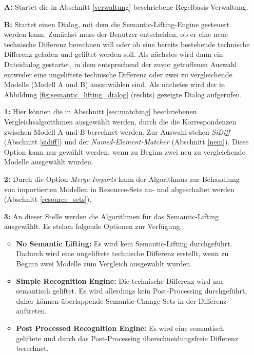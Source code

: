 \begin{itemize}
  \item[\textbf{A:}] Startet die in Abschnitt \ref{verwaltung} beschriebene Regelbasis-Verwaltung.
 
  \item[\textbf{B:}] Startet einen Dialog, mit dem die Semantic-Lifting-Engine gesteuert werden
  kann. Zunächst muss der Benutzer entscheiden, ob er eine neue technische Differenz berechnen will
  oder ob eine bereits bestehende technische Differenz geladen und geliftet werden soll. Als nächstes wird dann
  ein Dateidialog gestartet, in dem entsprechend der zuvor getroffenen Auswahl entweder eine
  ungeliftete technische Differenz oder zwei zu vergleichende Modelle (Modell A und B) auszuwählen
  sind. Als nächstes wird der in Abbildung \ref{fig:semantic_lifting_dialog} (rechts) gezeigte
  Dialog aufgerufen.

  \item[\textbf{1:}] Hier können die in Abschnitt \ref{sec:matching} beschriebenen
  Vergleichsalgorithmen ausgewählt werden, durch die die Korrespondenzen zwischen Modell A und B
  berechnet werden. Zur Auswahl stehen \textit{SiDiff} (Abschnitt \ref{sidiff}) und der
  \textit{Named-Element-Matcher} (Abschnitt \ref{nem}). Diese Option kann nur gewählt werden, wenn
  zu Beginn zwei neu zu vergleichende Modelle ausgewählt wurden.
  
  \item[\textbf{2:}] Durch die Option \textit{Merge Imports} kann der Algorithmus zur Behandlung
  von importierten Modellen in Resource-Sets an- und abgeschaltet werden (Abschnitt
  \ref{resource_sets}).
 
  \item[\textbf{3:}] An dieser Stelle werden die Algorithmen für das Semantic-Lifting ausgewählt.
  Es stehen folgende Optionen zur Verfügung.
  \begin{itemize}
    \item \textbf{No Semantic Lifting:} Es wird kein Semantic-Lifting durchgeführt. Dadurch wird
    eine ungeliftete technische Differenz erstellt, wenn zu Beginn zwei Modelle zum Vergleich
    ausgewählt wurden.
    
    \item \textbf{Simple Recognition Engine:} Die technische Differenz wird nur semantisch geliftet.
    Es wird allerdings kein Post-Processing durchgeführt, daher können überlappende
    Semantic-Change-Sets in der Differenz auftreten.
    
    \item \textbf{Post Processed Recognition Engine:} Es wird eine semantisch geliftete und durch
    das Post-Processing überschneidungsfreie Differenz berechnet.
    

\end{itemize}
\end{itemize}
